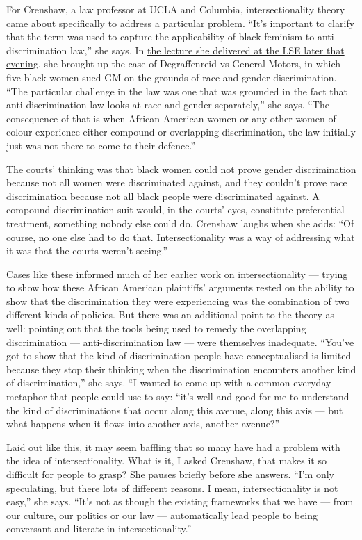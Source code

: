 \documentclass{article}
\begin{document}
For Crenshaw, a law professor at UCLA and Columbia, intersectionality theory
came about specifically to address a particular problem. ``It's important to
clarify that the term was used to capture the applicability of black feminism
to anti-discrimination law,'' she says. In
\href{http://www.lse.ac.uk/newsAndMedia/videoAndAudio/channels/publicLecturesAndEvents/player.aspx?id=2360}{the
	lecture she delivered at the LSE later that evening}, she brought up the
case of Degraffenreid vs General Motors, in which five black women sued GM on
the grounds of race and gender discrimination. ``The particular challenge in
the law was one that was grounded in the fact that anti-discrimination law
looks at race and gender separately,'' she says. ``The consequence of that is
when African American women or any other women of colour experience either
compound or overlapping discrimination, the law initially just was not there to
come to their defence.''

The courts' thinking was that black women could not prove gender discrimination
because not all women were discriminated against, and they couldn't prove race
discrimination because not all black people were discriminated against. A
compound discrimination suit would, in the courts' eyes, constitute
preferential treatment, something nobody else could do. Crenshaw laughs when
she adds: ``Of course, no one else had to do that. Intersectionality was a way
of addressing what it was that the courts weren't seeing.''

Cases like these informed much of her earlier work on intersectionality ---
trying to show how these African American plaintiffs' arguments rested on the
ability to show that the discrimination they were experiencing was the
combination of two different kinds of policies. But there was an additional
point to the theory as well: pointing out that the tools being used to remedy
the overlapping discrimination --- anti-discrimination law --- were themselves
inadequate. ``You've got to show that the kind of discrimination people have
conceptualised is limited because they stop their thinking when the
discrimination encounters another kind of discrimination,'' she says. ``I
wanted to come up with a common everyday metaphor that people could use to say:
``it's well and good for me to understand the kind of discriminations that
occur along this avenue, along this axis --- but what happens when it flows
into another axis, another avenue?''

Laid out like this, it may seem baffling that so many have had a problem with
the idea of intersectionality. What is it, I asked Crenshaw, that makes it so
difficult for people to grasp? She pauses briefly before she answers. ``I'm
only speculating, but there lots of different reasons. I mean,
intersectionality is not easy,'' she says. ``It's not as though the existing
frameworks that we have --- from our culture, our politics or our law ---
automatically lead people to being conversant and literate in
intersectionality.''
\end{document}
